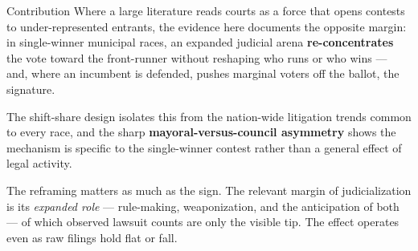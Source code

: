 
\begin{frame}{Contribution}
\hypertarget{src:contribution}{}
\small
Where a large literature reads courts as a  force that opens contests to under-represented entrants, the evidence here documents the opposite margin: in single-winner municipal races, an expanded judicial arena \textbf{re-concentrates} the vote toward the front-runner without reshaping who runs or who wins --- and, where an incumbent is defended, pushes marginal voters off the ballot, the  signature.
\medskip

The shift-share design isolates this from the nation-wide litigation trends common to every race, and the sharp \textbf{mayoral-versus-council asymmetry} shows the mechanism is specific to the single-winner contest rather than a general effect of legal activity.
\medskip

The reframing matters as much as the sign. The relevant margin of judicialization is its \emph{expanded role} --- rule-making, weaponization, and the anticipation of both --- of which observed lawsuit counts are only the visible tip. The effect operates even as raw filings hold flat or fall.
\end{frame}
